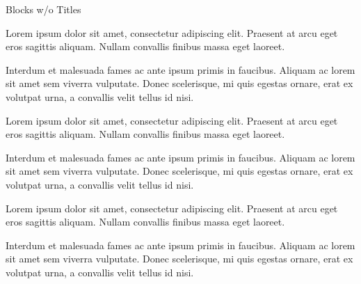 \documentclass[t]{beamer}  %
\begin{document}
\begin{frame}[fragile]{Blocks w/o Titles}
  \begin{block}{}
    Lorem ipsum dolor sit amet, consectetur adipiscing elit. Praesent at arcu eget eros sagittis aliquam. Nullam convallis finibus massa eget laoreet.

    Interdum et malesuada fames ac ante ipsum primis in faucibus. Aliquam ac lorem sit amet sem viverra vulputate. Donec scelerisque, mi quis egestas ornare, erat ex volutpat urna, a convallis velit tellus id nisi.
  \end{block}

  \begin{alertblock}{}
    Lorem ipsum dolor sit amet, consectetur adipiscing elit. Praesent at arcu eget eros sagittis aliquam. Nullam convallis finibus massa eget laoreet.

    Interdum et malesuada fames ac ante ipsum primis in faucibus. Aliquam ac lorem sit amet sem viverra vulputate. Donec scelerisque, mi quis egestas ornare, erat ex volutpat urna, a convallis velit tellus id nisi.
  \end{alertblock}

  \begin{exampleblock}{}
    Lorem ipsum dolor sit amet, consectetur adipiscing elit. Praesent at arcu eget eros sagittis aliquam. Nullam convallis finibus massa eget laoreet.

    Interdum et malesuada fames ac ante ipsum primis in faucibus. Aliquam ac lorem sit amet sem viverra vulputate. Donec scelerisque, mi quis egestas ornare, erat ex volutpat urna, a convallis velit tellus id nisi.
  \end{exampleblock}
\end{frame}
\end{document}
